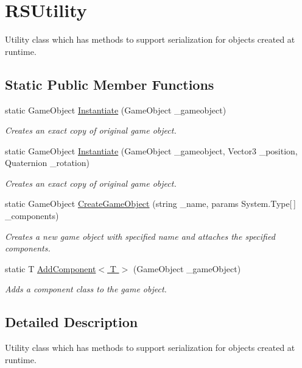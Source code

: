 \hypertarget{class_r_s_utility}{}\section{R\+S\+Utility}
\label{class_r_s_utility}


Utility class which has methods to support serialization for objects created at runtime.  


\subsection*{Static Public Member Functions}
\begin{DoxyCompactItemize}
\item 
static Game\+Object \hyperlink{class_r_s_utility_a9a14924ea59bb6f451e8f69e2fb649a7}{Instantiate} (Game\+Object \+\_\+gameobject)
\begin{DoxyCompactList}\small\item\em Creates an exact copy of original game object. \end{DoxyCompactList}\item 
static Game\+Object \hyperlink{class_r_s_utility_a5853ff696b08c22f55d37a93177338d9}{Instantiate} (Game\+Object \+\_\+gameobject, Vector3 \+\_\+position, Quaternion \+\_\+rotation)
\begin{DoxyCompactList}\small\item\em Creates an exact copy of original game object. \end{DoxyCompactList}\item 
static Game\+Object \hyperlink{class_r_s_utility_a35ddf47b4b9e37b290fc4cded36b0449}{Create\+Game\+Object} (string \+\_\+name, params System.\+Type\mbox{[}$\,$\mbox{]} \+\_\+components)
\begin{DoxyCompactList}\small\item\em Creates a new game object with specified name and attaches the specified components. \end{DoxyCompactList}\item 
static T \hyperlink{class_r_s_utility_ae6e80f89d975b2fe61cdf7b50d243b17}{Add\+Component$<$ T $>$} (Game\+Object \+\_\+game\+Object)
\begin{DoxyCompactList}\small\item\em Adds a component class to the game object. \end{DoxyCompactList}\end{DoxyCompactItemize}


\subsection{Detailed Description}
Utility class which has methods to support serialization for objects created at runtime. 



